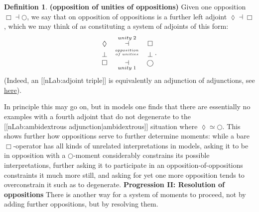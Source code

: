 \documentclass[12pt,titlepage]{article}
\newcommand{\itexarray}[1]{\begin{matrix}#1\end{matrix}}
\theoremstyle{plain}
\theoremstyle{definition}
\newtheorem{defn}{Definition}
\theoremstyle{remark}
\begin{document}
\begin{defn}
\label{HigherOrderOpposition}\hypertarget{HigherOrderOpposition}{}
\textbf{(opposition of unities of oppositions)}
Given one opposition $\Box \dashv \bigcirc$, we say that on opposition of oppositions is a further left adjoint $\lozenge \dashv \Box$, which we may think of as constituting a system of adjoints of this form:
\begin{displaymath}
\itexarray{
    \lozenge &\overset{unity\;2}{\dashv}& \Box
    \\
    \bot &\stackrel{opposition \atop {of\;unities}}{}& \bot
    \\
    \Box &\underset{unity\;1}{\dashv}& \bigcirc
  }
  \,.
\end{displaymath}
(Indeed, an [[nLab:adjoint triple]] is equivalently an adjunction of adjunctions, see \href{http://ncatlab.org/nlab/show/adjoint+triple#AsAdjunctionOfAdjunctions}{here}).
\end{defn}
In principle this may go on, but in models one finds that there are essentially no examples with a fourth adjoint that do not degenerate to the [[nLab:ambidextrous adjunction|ambidextrous]] situation where $\lozenge \simeq \bigcirc$.
This shows further how oppositions serve to further determine moments: while a bare $\Box$-operator has all kinds of unrelated interpretations in models, asking it to be in opposition with a $\bigcirc$-moment considerably constrains its possible interpretations, further asking it to participate in an opposition-of-oppositions constraints it much more still, and asking for yet one more opposition tends to overconstrain it such as to degenerate.
\textbf{Progression II: Resolution of oppositions}
There is another way for a system of moments to proceed, not by adding further oppositions, but by resolving them.
\end{document}
